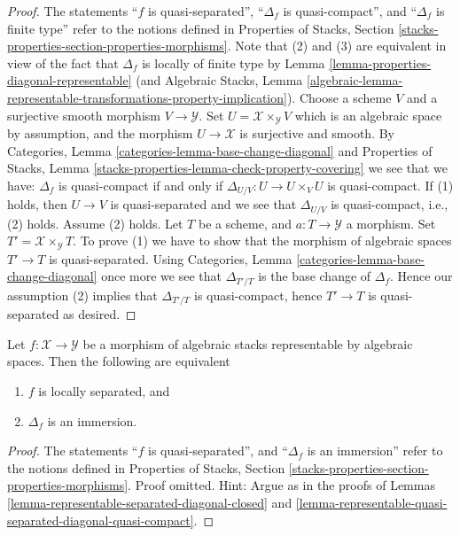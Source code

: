 \begin{proof}
The statements
``$f$ is quasi-separated'',
``$\Delta_f$ is quasi-compact'', and
``$\Delta_f$ is finite type''
refer to the notions defined in
Properties of Stacks,
Section \ref{stacks-properties-section-properties-morphisms}.
Note that (2) and (3) are equivalent in view of the fact that
$\Delta_f$ is locally of finite type by
Lemma \ref{lemma-properties-diagonal-representable}
(and
Algebraic Stacks, Lemma
\ref{algebraic-lemma-representable-transformations-property-implication}).
Choose a scheme $V$ and a surjective smooth morphism $V \to \mathcal{Y}$.
Set $U = \mathcal{X} \times_{\mathcal{Y}} V$ which is an algebraic
space by assumption, and the morphism $U \to \mathcal{X}$ is surjective
and smooth. By
Categories, Lemma \ref{categories-lemma-base-change-diagonal}
and
Properties of Stacks,
Lemma \ref{stacks-properties-lemma-check-property-covering}
we see that we have: $\Delta_f$ is quasi-compact if and only if
$\Delta_{U/V} : U \to  U \times_V U$ is quasi-compact.
If (1) holds, then $U \to V$ is quasi-separated and we see that
$\Delta_{U/V}$ is quasi-compact, i.e., (2) holds.
Assume (2) holds. Let $T$ be a scheme, and $a : T \to \mathcal{Y}$
a morphism. Set $T' = \mathcal{X} \times_{\mathcal{Y}} T$. To prove
(1) we have to show that the morphism of algebraic spaces $T' \to T$
is quasi-separated. Using
Categories, Lemma \ref{categories-lemma-base-change-diagonal}
once more we see that $\Delta_{T'/T}$ is the base change of
$\Delta_f$. Hence our assumption (2) implies that $\Delta_{T'/T}$
is quasi-compact, hence $T' \to T$ is quasi-separated as desired.
\end{proof}

\begin{lemma}
\label{lemma-representable-locally-separated-diagonal-immersion}
Let $f : \mathcal{X} \to \mathcal{Y}$ be a morphism of algebraic stacks
representable by algebraic spaces. Then the following are equivalent
\begin{enumerate}
\item $f$ is locally separated, and
\item $\Delta_f$ is an immersion.
\end{enumerate}
\end{lemma}

\begin{proof}
The statements ``$f$ is quasi-separated'', and ``$\Delta_f$ is an immersion''
refer to the notions defined in
Properties of Stacks,
Section \ref{stacks-properties-section-properties-morphisms}.
Proof omitted. Hint: Argue as in the proofs of
Lemmas \ref{lemma-representable-separated-diagonal-closed} and
\ref{lemma-representable-quasi-separated-diagonal-quasi-compact}.
\end{proof}






